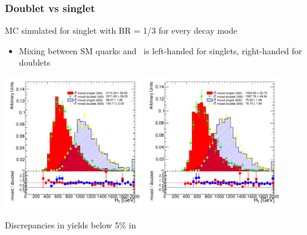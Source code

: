 
\begin{frame}\frametitle{Doublet vs singlet}
\centering\myskip\scriptsize

MC simulated for {\cccolor singlet \T} with BR = 1/3 for
every decay mode

\begin{itemize}
\item Mixing between SM quarks and \T\ is {\cccolor left-handed} for singlets, {\cccolor right-handed} for doublets
\end{itemize}

\includegraphics[width=0.45\textwidth]{pics/doubletcomp_HTAll_ELEMUON_6jetin3btagex_NOMINAL}
\includegraphics[width=0.45\textwidth]{pics/doubletcomp_HTAll_ELEMUON_6jetin4btagin_NOMINAL}

Discrepancies in yields below 5\% in \pchiv

\end{frame}



